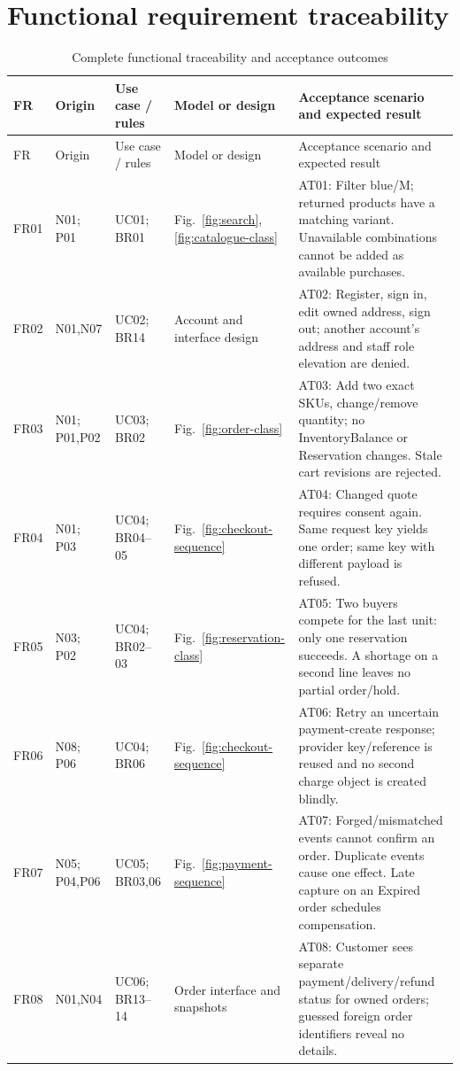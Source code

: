 \section{Functional requirement traceability}
\begin{longtable}{P{.08\linewidth}P{.13\linewidth}P{.16\linewidth}P{.18\linewidth}P{.33\linewidth}}
\caption{Complete functional traceability and acceptance outcomes}\label{tab:trace-fr}\\
\toprule FR & Origin & Use case / rules & Model or design & Acceptance scenario and expected result \\\midrule\endfirsthead
\toprule FR & Origin & Use case / rules & Model or design & Acceptance scenario and expected result \\\midrule\endhead
FR01 & N01; P01 & UC01; BR01 & Fig.~\ref{fig:search}, \ref{fig:catalogue-class} & AT01: Filter blue/M; returned products have a matching variant. Unavailable combinations cannot be added as available purchases.\\
FR02 & N01,N07 & UC02; BR14 & Account and interface design & AT02: Register, sign in, edit owned address, sign out; another account's address and staff role elevation are denied.\\
FR03 & N01; P01,P02 & UC03; BR02 & Fig.~\ref{fig:order-class} & AT03: Add two exact SKUs, change/remove quantity; no InventoryBalance or Reservation changes. Stale cart revisions are rejected.\\
FR04 & N01; P03 & UC04; BR04--05 & Fig.~\ref{fig:checkout-sequence} & AT04: Changed quote requires consent again. Same request key yields one order; same key with different payload is refused.\\
FR05 & N03; P02 & UC04; BR02--03 & Fig.~\ref{fig:reservation-class} & AT05: Two buyers compete for the last unit: only one reservation succeeds. A shortage on a second line leaves no partial order/hold.\\
FR06 & N08; P06 & UC04; BR06 & Fig.~\ref{fig:checkout-sequence} & AT06: Retry an uncertain payment-create response; provider key/reference is reused and no second charge object is created blindly.\\
FR07 & N05; P04,P06 & UC05; BR03,06 & Fig.~\ref{fig:payment-sequence} & AT07: Forged/mismatched events cannot confirm an order. Duplicate events cause one effect. Late capture on an Expired order schedules compensation.\\
FR08 & N01,N04 & UC06; BR13--14 & Order interface and snapshots & AT08: Customer sees separate payment/delivery/refund status for owned orders; guessed foreign order identifiers reveal no details.\\

\end{longtable}
